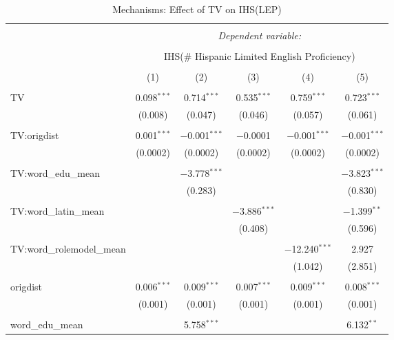 
\begin{table}[!htbp] \centering 
  \caption{Mechanisms: Effect of TV on IHS(LEP)} 
  \label{} 
\begin{tabular}{@{\extracolsep{-2pt}}lccccc} 
\\[-1.8ex]\hline 
\hline \\[-1.8ex] 
 & \multicolumn{5}{c}{\textit{Dependent variable:}} \\ 
\cline{2-6} 
\\[-1.8ex] & \multicolumn{5}{c}{IHS(\# Hispanic Limited English Proficiency)} \\ 
\\[-1.8ex] & (1) & (2) & (3) & (4) & (5)\\ 
\hline \\[-1.8ex] 
 TV & 0.098$^{***}$ & 0.714$^{***}$ & 0.535$^{***}$ & 0.759$^{***}$ & 0.723$^{***}$ \\ 
  & (0.008) & (0.047) & (0.046) & (0.057) & (0.061) \\ 
  & & & & & \\ 
 TV:origdist & 0.001$^{***}$ & $-$0.001$^{***}$ & $-$0.0001 & $-$0.001$^{***}$ & $-$0.001$^{***}$ \\ 
  & (0.0002) & (0.0002) & (0.0002) & (0.0002) & (0.0002) \\ 
  & & & & & \\ 
 TV:word\_edu\_mean &  & $-$3.778$^{***}$ &  &  & $-$3.823$^{***}$ \\ 
  &  & (0.283) &  &  & (0.830) \\ 
  & & & & & \\ 
 TV:word\_latin\_mean &  &  & $-$3.886$^{***}$ &  & $-$1.399$^{**}$ \\ 
  &  &  & (0.408) &  & (0.596) \\ 
  & & & & & \\ 
 TV:word\_rolemodel\_mean &  &  &  & $-$12.240$^{***}$ & 2.927 \\ 
  &  &  &  & (1.042) & (2.851) \\ 
  & & & & & \\ 
 origdist & 0.006$^{***}$ & 0.009$^{***}$ & 0.007$^{***}$ & 0.009$^{***}$ & 0.008$^{***}$ \\ 
  & (0.001) & (0.001) & (0.001) & (0.001) & (0.001) \\ 
  & & & & & \\ 
 word\_edu\_mean &  & 5.758$^{***}$ &  &  & 6.132$^{**}$ \\ 

\end{tabular}
\end{table}
